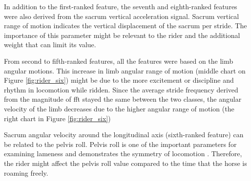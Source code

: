In addition to the first-ranked feature, the seventh and eighth-ranked features were also derived from the sacrum vertical acceleration signal. Sacrum vertical range of motion indicates the vertical displacement of the sacrum per stride. The importance of this parameter might be relevant to the rider and the additional weight that can limit its value.

From second to fifth-ranked features, all the features were based on the limb angular motions. This increase in limb angular range of motion (middle chart on Figure \ref{fig:rider_six}) might be due to the more excitement or discipline and rhythm in locomotion while ridden. Since the average stride frequency derived from the magnitude of \gls{fft} stayed the same between the two classes, the angular velocity of the limb decreases due to the higher angular range of motion (the right chart in Figure \ref{fig:rider_six})

Sacrum angular velocity around the longitudinal axis (sixth-ranked feature) can be related to the pelvis roll. Pelvis roll is one of the important parameters for examining lameness and demonstrates the symmetry of locomotion \cite{Pfau2013}. Therefore, the rider might affect the pelvis roll value compared to the time that the horse is roaming freely.
